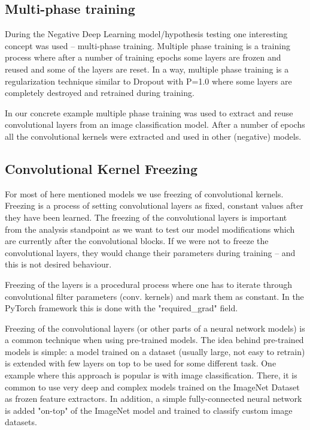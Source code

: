 \documentclass[b5paper]{book}
\begin{document}
\subsection{Multi-phase training}

During the Negative Deep Learning model/hypothesis testing one interesting concept was used -- multi-phase training. Multiple phase training is a training process where after a number of training epochs some layers are frozen and reused and some of the layers are reset. In a way, multiple phase training is a regularization technique similar to Dropout with P=1.0 where some layers are completely destroyed and retrained during training. 

In our concrete example multiple phase training was used to extract and reuse convolutional layers from an image classification model. After a number of epochs all the convolutional kernels were extracted and used in other (negative) models.

\subsection{Convolutional Kernel Freezing}

For most of here mentioned models we use freezing of convolutional kernels. Freezing is a process of setting convolutional layers as fixed, constant values after they have been learned. The freezing of the convolutional layers is important from the analysis standpoint as we want to test our model modifications which are currently after the convolutional blocks. If we were not to freeze the convolutional layers, they would change their parameters during training -- and this is not desired behaviour. 

Freezing of the layers is a procedural process where one has to iterate through convolutional filter parameters (conv. kernels) and mark them as constant. In the PyTorch framework this is done with the "required\_grad" field.

Freezing of the convolutional layers (or other parts of a neural network models) is a common technique when using pre-trained models. The idea behind pre-trained models is simple: a model trained on a dataset (usually large, not easy to retrain) is extended with few layers on top to be used for some different task. One example where this approach is popular is with image classification. There, it is common to use very deep and complex models trained on the ImageNet Dataset as frozen feature extractors. In addition, a simple fully-connected neural network is added "on-top" of the ImageNet model and trained to classify custom image datasets.
\end{document}

